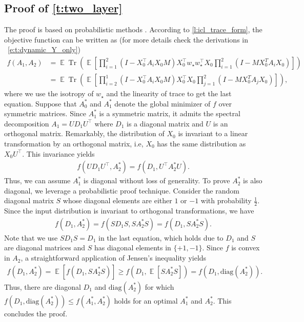\documentclass{article}
\DeclareMathOperator{\E}{\mathbb{E}}
\newcommand{\wstar}{w_\star}
\DeclareMathOperator{\tr}{Tr}
\newcommand{\diag}{\mathrm{diag}}
\begin{document}
\subsection{Proof of \autoref{t:two_layer}}
The proof is based on probabilistic methods \citep{alon2016probabilistic}. 
According to \autoref{l:icl_trace_form}, the objective function can be written as (for more details check the derivations in ~\eqref{e:t:dynamic_Y_only}) 
\begin{align}
f(A_1,A_2) & = \E \tr\left( \E \left[\prod_{i=1}^2 (I -  X_0^\top A_i X_0 M) X_0^\top \wstar \wstar^\top X_0 \prod_{i=1}^2 (I - M X_0^T A_i X_0) \right]\right) \\ 
& = \E \tr\left( \E \left[\prod_{i=2}^1 (I -  X_0^\top A_i X_0 M) X_0^\top X_0 \prod_{j=1}^2 (I - M X_0^T A_j X_0) \right]\right), 
\end{align}
where we use the isotropy of $\wstar$ and the linearity of trace to get the last equation.
Suppose that $A_0^*$ and $A_1^*$ denote the global minimizer of $f$ over symmetric matrices. Since $A_1^*$ is a symmetric matrix, it admits the spectral  decomposition $A_1 = U D_1 U^\top$ where $D_1$ is a diagonal matrix and $U$ is an orthogonal matrix. Remarkably,  the distribution of $X_0$ is invariant to a linear transformation by an orthogonal matrix, i.e, $X_0$ has the same distribution as $X_0 U^\top$. This invariance yields 
\begin{align}
f(U D_1 U^\top, A_2^*) = f(D_1, U^\top A_2^* U).
\end{align}
Thus, we can assume $A_1^*$ is diagonal without loss of generality. To prove $A_2^*$ is also diagonal, we leverage a probabilistic proof technique. Consider the random diagonal matrix $S$ whose diagonal elements are either $1$ or $-1$ with probability $\frac{1}{2}$. Since the input distribution is invariant to orthogonal transformations, we have 
\begin{align}
f( D_1, A_2^*) = f(S D_1 S, S A_2^* S) = f(D_1, S A_2^* S).
\end{align}
Note that we use $S D_1 S = D_1$ in the last equation, which holds due to $D_1$ and $S$ are diagonal matrices and $S$ has diagonal elements in $\{+1, -1 \}$. Since $f$ is convex in $A_2$, a straightforward application of Jensen's inequality yields 
\begin{align}
f(D_1, A_2^*) = \E \left[ f(D_1, S A_2^* S) \right] \geq f(D_1, \E \left[ S A_2^* S \right]) = f(D_1, \diag(A_2^*)).
\end{align}
Thus, there are diagonal $D_1$ and $\diag(A_2^*)$ for which $f(D_1, \diag(A_2^*)) \leq f(A_1^*, A_2^*)$ holds for an optimal $A_1^*$ and $A_2^*$. This concludes the proof.
\end{document}
